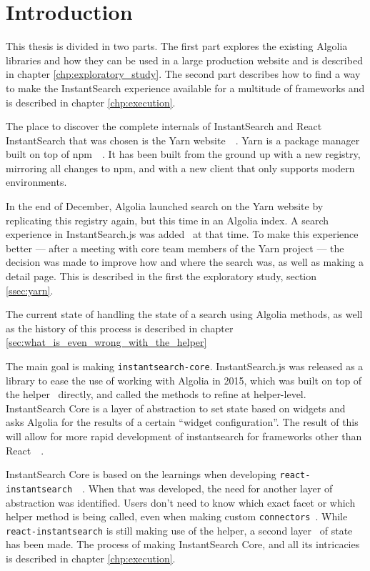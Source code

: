 
\chapter{Introduction} %
\label{chp:introduction}

This thesis is divided in two parts. The first part explores the existing Algolia libraries and how they can be used in a large production website and is described in chapter \ref{chp:exploratory_study}. The second part describes how to find a way to make the InstantSearch experience available for a multitude of frameworks and is described in chapter \ref{chp:execution}.

The place to discover the complete internals of InstantSearch and React InstantSearch that was chosen is the Yarn website~\cite{yarn-site}~. Yarn is a package manager built on top of npm~\cite{npm-github}~. It has been built from the ground up with a new registry, mirroring all changes to npm, and with a new client that only supports modern environments.

In the end of December, Algolia launched search on the Yarn website by replicating this registry again, but this time in an Algolia index. A search experience in InstantSearch.js was added~\cite{yarn-pr-add-algolia} at that time. To make this experience better --- after a meeting with core team members of the Yarn project --- the decision was made to improve how and where the search was, as well as making a detail page. This is described in the first the exploratory study, section \ref{ssec:yarn}.

The current state of handling the state of a search using Algolia methods, as well as the history of this process is described in chapter \ref{sec:what_is_even_wrong_with_the_helper}

The main goal is making {\tt instantsearch-core}. InstantSearch.js was released as a library to ease the use of working with Algolia in 2015, which was built on top of the helper~\cite{algolia-js-helper} directly, and called the methods to refine at helper-level. InstantSearch Core is a layer of abstraction to set state based on widgets and asks Algolia for the results of a certain ``widget configuration''. The result of this will allow for more rapid development of instantsearch for frameworks other than React~\cite{react-doc}~.

InstantSearch Core is based on the learnings when developing {\tt react-instantsearch}~\cite{react-instantsearch}~.  When that was developed, the need for another layer of abstraction was identified. Users don't need to know which exact facet or which helper method is being called, even when making custom {\tt connectors}\cite{react-instantsearch-connectors}~. While {\tt react-instantsearch} is still making use of the helper, a second layer~\cite{react-instantsearch-search-state} of state has been made. The process of making InstantSearch Core, and all its intricacies is described in chapter \ref{chp:execution}.
